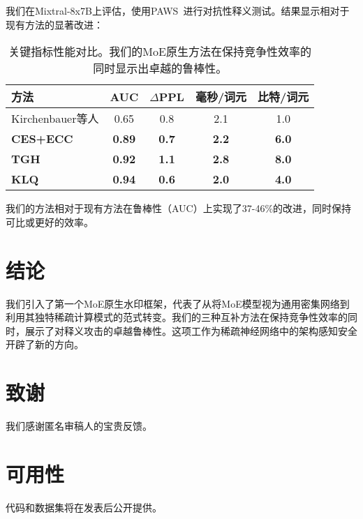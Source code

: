 \documentclass[letterpaper,twocolumn,10pt]{article}
\begin{document}
我们在Mixtral-8x7B上评估，使用PAWS~\cite{zhang2019paws}进行对抗性释义测试。结果显示相对于现有方法的显著改进：

\begin{table}[h]
\centering
\small
\begin{tabular}{|l|c|c|c|c|}
\hline
\textbf{方法} & \textbf{AUC} & \textbf{$\Delta$PPL} & \textbf{毫秒/词元} & \textbf{比特/词元} \\
\hline
Kirchenbauer等人 & 0.65 & 0.8 & 2.1 & 1.0 \\
\textbf{CES+ECC} & \textbf{0.89} & \textbf{0.7} & \textbf{2.2} & \textbf{6.0} \\
\textbf{TGH} & \textbf{0.92} & \textbf{1.1} & \textbf{2.8} & \textbf{8.0} \\
\textbf{KLQ} & \textbf{0.94} & \textbf{0.6} & \textbf{2.0} & \textbf{4.0} \\
\hline
\end{tabular}
\caption{关键指标性能对比。我们的MoE原生方法在保持竞争性效率的同时显示出卓越的鲁棒性。}
\end{table}

我们的方法相对于现有方法在鲁棒性（AUC）上实现了37-46\%的改进，同时保持可比或更好的效率。

\section{结论}

我们引入了第一个MoE原生水印框架，代表了从将MoE模型视为通用密集网络到利用其独特稀疏计算模式的范式转变。我们的三种互补方法在保持竞争性效率的同时，展示了对释义攻击的卓越鲁棒性。这项工作为稀疏神经网络中的架构感知安全开辟了新的方向。

\section*{致谢}

我们感谢匿名审稿人的宝贵反馈。

\section*{可用性}

代码和数据集将在发表后公开提供。




\end{document}
